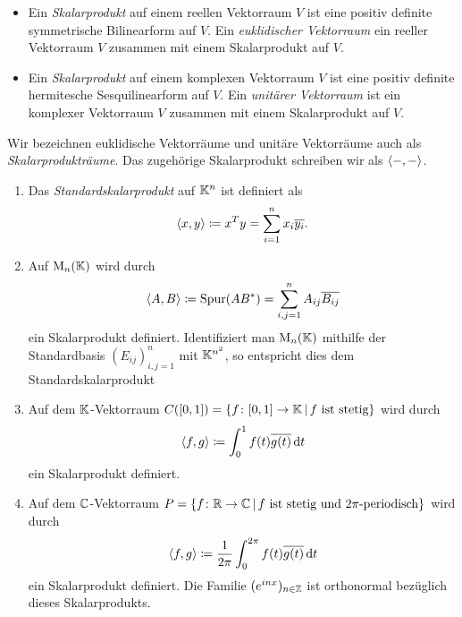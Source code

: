 \begin{definition}
  \leavevmode
  \begin{itemize}
    \item
      Ein \emph{Skalarprodukt} auf einem reellen Vektorraum $V$ ist eine positiv definite symmetrische Bilinearform auf $V$.
      Ein \emph{euklidischer Vektorraum} ein reeller Vektorraum $V$ zusammen mit einem Skalarprodukt auf $V$.
    \item
      Ein \emph{Skalarprodukt} auf einem komplexen Vektorraum $V$ ist eine positiv definite hermitesche Sesquilinearform auf $V$.
      Ein \emph{unitärer Vektorraum} ist ein komplexer Vektorraum $V$ zusammen mit einem Skalarprodukt auf $V$.
  \end{itemize}

  Wir bezeichnen euklidische Vektorräume und unitäre Vektorräume auch als \emph{Skalarprodukträume}.
  Das zugehörige Skalarprodukt schreiben wir als $\left\langle -, - \right\rangle$.
\end{definition}



\begin{definition}
  \leavevmode
  \begin{enumerate}
    \item
      Das \emph{Standardskalarprodukt} auf $\mathbb{K}^n$ ist definiert als
      \[
                  \left\langle x, y \right\rangle
        \coloneqq x^T y
        =         \sum_{i=1}^n x_i \overline{y_i}.
      \]
    \item
      Auf $\operatorname{M}_{n}(\mathbb{K})$ wird durch
      \[
                  \left\langle A, B \right\rangle
        \coloneqq \operatorname{Spur} (A B^*)
        =         \sum_{i,j = 1}^n A_{ij} \overline{B_{ij}}
      \]
      ein Skalarprodukt definiert.
      Identifiziert man $\operatorname{M}_{n}(\mathbb{K})$ mithilfe der Standardbasis $(E_{ij})_{i,j = 1}^n$ mit $\mathbb{K}^{n^2}$, so entspricht dies dem Standardskalarprodukt

    \item
      Auf dem $\mathbb{K}$-Vektorraum $C([0,1]) = \{f \colon [0,1] \to \mathbb{K} \,|\, \text{$f$ ist stetig} \}$ wird durch
      \[
                  \left\langle f, g \right\rangle
        \coloneqq \int_0^1 f(t) \overline{g(t)} \,\text{d}t
      \]
      ein Skalarprodukt definiert.
    \item
      Auf dem $\mathbb{C}$-Vektorraum $P = \{f \colon \mathbb{R} \to \mathbb{C} \,|\, \text{$f$ ist stetig und $2\pi$-periodisch} \}$ wird durch
      \[
                  \left\langle f, g \right\rangle
        \coloneqq \frac{1}{2\pi} \int_0^{2\pi} f(t) \overline{g(t)} \,\text{d}t
      \]
      ein Skalarprodukt definiert.
      Die Familie $(e^{inx})_{n \in \mathbb{Z}}$ ist orthonormal bezüglich dieses Skalarprodukts.
  \end{enumerate}
\end{definition}

